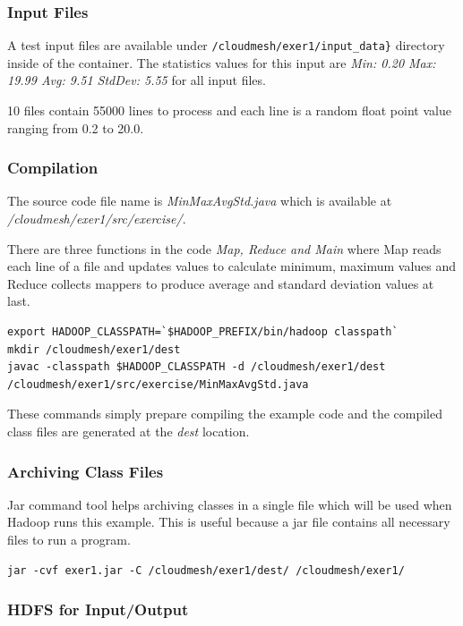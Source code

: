 \subsubsection{Input Files}

A test input files are available under
\verb|/cloudmesh/exer1/input_data}|
directory inside of the container.  The statistics values for this
input are \textit{Min: 0.20 Max: 19.99 Avg: 9.51 StdDev: 5.55} for all
input files.

10 files contain 55000 lines to process and each line is a random
float point value ranging from 0.2 to 20.0.

\subsubsection{Compilation}

The source code file name is \textit{MinMaxAvgStd.java} which is
available at \textit{/cloudmesh/exer1/src/exercise/}.

There are three functions in the code \textit{Map, Reduce and Main}
where Map reads each line of a file and updates values to calculate
minimum, maximum values and Reduce collects mappers to produce average
and standard deviation values at last.

\begin{lstlisting}
export HADOOP_CLASSPATH=`$HADOOP_PREFIX/bin/hadoop classpath`
mkdir /cloudmesh/exer1/dest
javac -classpath $HADOOP_CLASSPATH -d /cloudmesh/exer1/dest /cloudmesh/exer1/src/exercise/MinMaxAvgStd.java
\end{lstlisting}

These commands simply prepare compiling the example code and the
compiled class files are generated at the \textit{dest} location.

\subsubsection{Archiving Class Files}

Jar command tool helps archiving classes in a single file which will be used
when Hadoop runs this example. This is useful because a jar file contains all
necessary files to run a program.

\begin{lstlisting}
jar -cvf exer1.jar -C /cloudmesh/exer1/dest/ /cloudmesh/exer1/
\end{lstlisting}

\subsubsection{HDFS for Input/Output}

